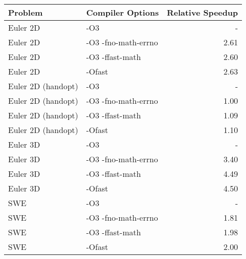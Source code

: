 \begin{tabular}{llr}
\toprule
Problem & Compiler Options & Relative Speedup \\
\midrule
Euler 2D & -O3 & - \\
Euler 2D & -O3 -fno-math-errno & 2.61 \\
Euler 2D & -O3 -ffast-math & 2.60 \\
Euler 2D & -Ofast & 2.63 \\
Euler 2D (handopt) & -O3 & - \\
Euler 2D (handopt) & -O3 -fno-math-errno & 1.00 \\
Euler 2D (handopt) & -O3 -ffast-math & 1.09 \\
Euler 2D (handopt) & -Ofast & 1.10 \\
Euler 3D & -O3 & - \\
Euler 3D & -O3 -fno-math-errno & 3.40 \\
Euler 3D & -O3 -ffast-math & 4.49 \\
Euler 3D & -Ofast & 4.50 \\
SWE & -O3 & - \\
SWE & -O3 -fno-math-errno & 1.81 \\
SWE & -O3 -ffast-math & 1.98 \\
SWE & -Ofast & 2.00 \\
\bottomrule
\end{tabular}
